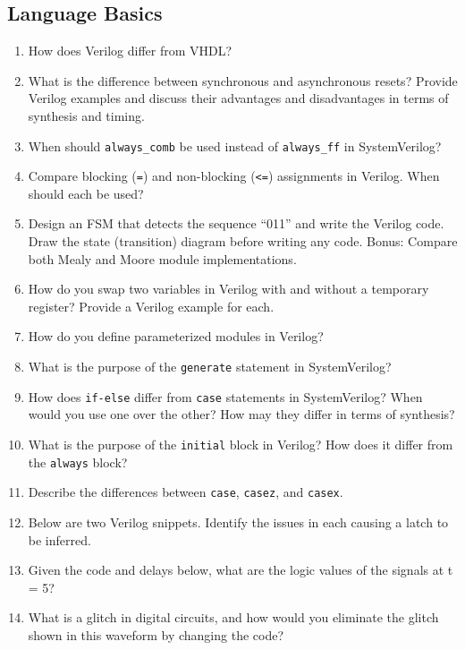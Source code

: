 \documentclass[11pt]{article}
\begin{document}
\subsection{Language Basics}
\begin{enumerate}
    \item How does Verilog differ from VHDL?
    \item What is the difference between synchronous and asynchronous resets?
    Provide Verilog examples and discuss their advantages and disadvantages in
    terms of synthesis and timing.
    \item When should \texttt{always\_comb} be used instead of
    \texttt{always\_ff} in SystemVerilog?
    \item Compare blocking (\verb|=|) and non-blocking (\verb|<=|) assignments
    in Verilog. When should each be used?
    \item Design an FSM that detects the sequence “011” and write the Verilog
    code. Draw the state (transition) diagram before writing any code. Bonus:
    Compare both Mealy and Moore module implementations.
    \item How do you swap two variables in Verilog with and without a temporary
    register? Provide a Verilog example for each.
    \item How do you define parameterized modules in Verilog?
    \item What is the purpose of the \texttt{generate} statement in
    SystemVerilog?
    \item How does \texttt{if-else} differ from \texttt{case} statements in SystemVerilog? When
    would you use one over the other? How may they differ in terms of
    synthesis?
    \item What is the purpose of the \texttt{initial} block in Verilog? How
    does it differ from the \texttt{always} block?
    \item Describe the differences between \texttt{case}, \texttt{casez}, and
    \texttt{casex}.
    \item Below are two Verilog snippets. Identify the issues in each causing a
    latch to be inferred.
    

    \item Given the code and delays below, what are the logic values of the
    signals at t = 5?
    


    \item What is a glitch in digital circuits, and how would you eliminate the
    glitch shown in this waveform by changing the code?
    
    


\end{enumerate}
\end{document}
